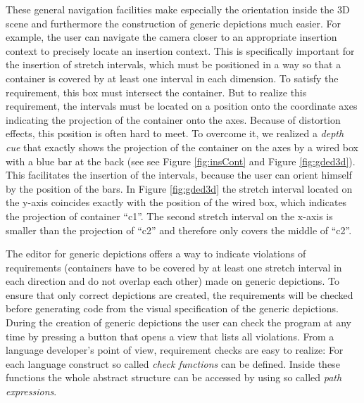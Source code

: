 \documentclass[a4paper]{article}
\begin{document}
These general navigation facilities make especially the orientation inside the 3D scene and furthermore the construction of generic depictions much easier. For example, the user can navigate the camera closer to an appropriate insertion context to precisely locate an insertion context. This is specifically important for the insertion of stretch intervals, which must be positioned in a way so that a container is covered by at least one interval in each dimension. To satisfy the requirement, this box must intersect the container. But to realize this requirement, the intervals must be located on a position onto the coordinate axes indicating the projection of the container onto the axes. Because of distortion effects, this position is often hard to meet. To overcome it, we realized a \emph{depth cue} that exactly shows the projection of the container on the axes by a wired box with a blue bar at the back (see see Figure \ref{fig:insCont} and Figure \ref{fig:gded3d}). This facilitates the insertion of the intervals, because the user can orient himself by the position of the bars. In Figure \ref{fig:gded3d} the stretch interval located on the $\mathrm{y}$-axis coincides exactly with the position of the wired box, which indicates the projection of container ``c1''. The second stretch interval on the $\mathrm{x}$-axis is smaller than the projection of ``c2'' and therefore only covers the middle of ``c2''.

The editor for generic depictions offers a way to indicate violations of requirements (containers have to be covered by at least one stretch interval in each direction and do not overlap each other) made on generic depictions. To ensure that only correct depictions are created, the requirements will be checked before generating code from the visual specification of the generic depictions. During the creation of generic depictions the user can check the program at any time by pressing a button that opens a view that lists all violations. From a language developer's point of view, requirement checks are easy to realize: For each language construct so called \emph{check functions} can be defined. Inside these functions the whole abstract structure can be accessed by using so called \emph{path expressions}.
\end{document}
